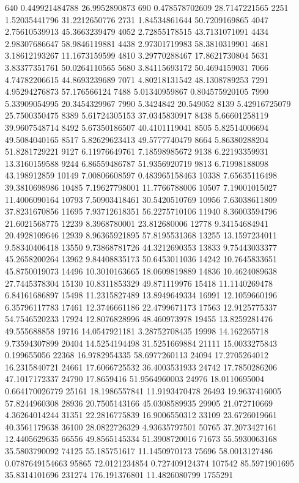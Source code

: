640     0.449921484788  26.9952890873
690     0.478578702609  28.7147221565
2251    1.52035441796   31.2212650776
2731    1.84534861644   50.7209169865
4047    2.75610539913   45.3663239479
4052    2.72855178515   43.7131071091
4434    2.98307686647   58.9846119881
4438    2.97301719983   58.3810319901
4681    3.18612193267   11.1673159599
4810    3.29770288467   17.8621730804
5631    3.83377351761   50.0264110565
5680    3.84115693172   50.4694159031
7066    4.74782206615   44.8693239689
7071    4.80218131542   48.1308789253
7291    4.95294276873   57.176566124
7488    5.01340959867   0.804575920105
7990    5.33909054995   20.3454329967
7990    5.3424842       20.549052
8139    5.42916725079   25.7500350475
8389    5.61724305153   37.0345830917
8438    5.66601258119   39.9607548714
8492    5.67350186507   40.4101119041
8505    5.82514006694   49.5084040165
8517    5.82629623413   49.5777740479
8664    5.86380288204   51.8281729221
9127    6.11976649761   7.18598985672
9138    6.22193359931   13.3160159588
9244    6.86559486787   51.9356920719
9813    6.71998188098   43.198912859
10149   7.00806608597   0.483965158463
10338   7.65635116498   39.3810698986
10485   7.19627798001   11.7766788006
10507   7.19001015027   11.4006090164
10793   7.50903418461   30.5420510769
10956   7.63038611809   37.8231670856
11695   7.93712618351   56.2275710106
11940   8.36003594796   21.6021568775
12239   8.3968780001    23.812680006
12778   9.34154684941   20.4928109646
12939   8.96365921895   57.8195531368
13255   13.1597234011   9.58340406418
13550   9.73868781726   44.3212690353
13833   9.75443033377   45.2658200264
13962   9.84408835173   50.6453011036
14242   10.7645833651   45.8750019073
14496   10.3010163665   18.0609819889
14836   10.4624089638   27.7445378304
15130   10.8311853329   49.871119976
15418   11.1140269478   6.84161686897
15498   11.2315827489   13.8949649334
16991   12.1059660196   6.35796117783
17461   12.3746661186   22.4799671173
17563   12.9125775337   54.7546520233
17924   12.8076828996   48.460973978
19455   13.8259281476   49.555688858
19716   14.0547921181   3.28752708435
19998   14.162265718    9.73594307899
20404   14.5254194498   31.5251669884
21111   15.0033275843   0.199655056
22368   16.9782954335   58.6977260113
24094   17.2705264012   16.2315840721
24661   17.6066725532   36.4003531933
24742   17.7850286206   47.1017172337
24790   17.8659416      51.9564960003
24976   18.0110695004   0.664170026779
25161   18.1986557841   11.9193470478
26493   19.9637416005   57.8244960308
28936   20.7505143166   45.0308589935
29905   21.072710669    4.36264014244
31351   22.2816775839   16.9006550312
33109   23.6726019661   40.3561179638
36100   28.0822726329   4.93635797501
50765   37.2073427161   12.4405629635
66556   49.8565145334   51.3908720016
71673   55.5930063168   35.5803790092
74125   55.185751617    11.1450970173
75696   58.0013127486   0.0787649154663
95865   72.0121234854   0.727409124374
107542  85.5971901695   35.8314101696
231274  176.191376801   11.4826080799
1755291
